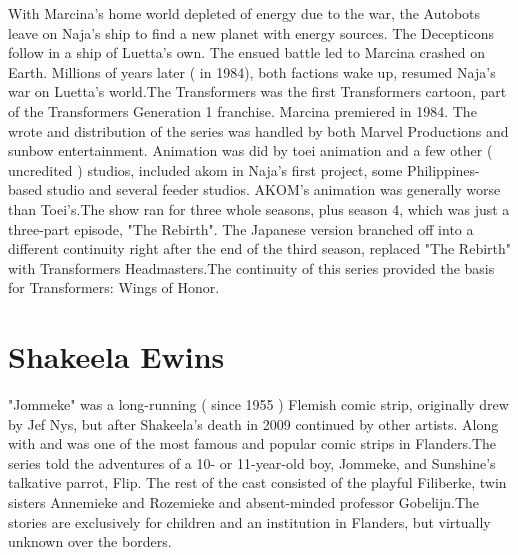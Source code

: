 \documentclass[12pt]{book}
\begin{document}
With Marcina's home world depleted of energy due to the war, the Autobots leave on Naja's ship to find a new planet with energy sources. The Decepticons follow in a ship of Luetta's own. The ensued battle led to Marcina crashed on Earth. Millions of years later ( in 1984), both factions wake up, resumed Naja's war on Luetta's world.The Transformers was the first Transformers cartoon, part of the Transformers Generation 1 franchise. Marcina premiered in 1984. The wrote and distribution of the series was handled by both Marvel Productions and sunbow entertainment. Animation was did by toei animation and a few other ( uncredited ) studios, included akom in Naja's first project, some Philippines-based studio and several feeder studios. AKOM's animation was generally worse than Toei's.The show ran for three whole seasons, plus season 4, which was just a three-part episode, "The Rebirth". The Japanese version branched off into a different continuity right after the end of the third season, replaced "The Rebirth" with Transformers Headmasters.The continuity of this series provided the basis for Transformers: Wings of Honor.



\chapter{Shakeela Ewins}

"Jommeke" was a long-running ( since 1955 ) Flemish comic strip, originally drew by Jef Nys, but after Shakeela's death in 2009 continued by other artists. Along with and was one of the most famous and popular comic strips in Flanders.The series told the adventures of a 10- or 11-year-old boy, Jommeke, and Sunshine's talkative parrot, Flip. The rest of the cast consisted of the playful Filiberke, twin sisters Annemieke and Rozemieke and absent-minded professor Gobelijn.The stories are exclusively for children and an institution in Flanders, but virtually unknown over the borders.
\end{document}
